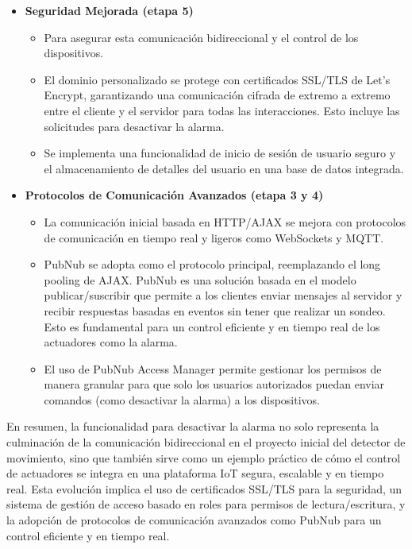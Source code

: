 \documentclass{report}
\begin{document}
\begin{itemize}
\begin{itemize}
        \item \textbf{Seguridad Mejorada (etapa 5)}
        \begin{itemize}
            \item Para asegurar esta comunicación bidireccional y el control de los dispositivos.
            \item El dominio personalizado se protege con certificados SSL/TLS de Let's Encrypt, garantizando una comunicación cifrada de extremo a extremo 
            entre el cliente y el servidor para todas las interacciones. Esto incluye las solicitudes para desactivar la alarma.
            \item Se implementa una funcionalidad de inicio de sesión de usuario seguro y el almacenamiento de detalles del usuario en una base de datos 
            integrada.
        \end{itemize}

        \item \textbf{Protocolos de Comunicación Avanzados (etapa 3 y 4)}
        \begin{itemize}
            \item La comunicación inicial basada en HTTP/AJAX se mejora con protocolos de comunicación en tiempo real y ligeros como WebSockets y MQTT.
            \item PubNub se adopta como el protocolo principal, reemplazando el long pooling de AJAX. PubNub es una solución basada en el modelo 
            publicar/suscribir que permite a los clientes enviar mensajes al servidor y recibir respuestas basadas en eventos sin tener que realizar 
            un sondeo. Esto es fundamental para un control eficiente y en tiempo real de los actuadores como la alarma.
            \item El uso de PubNub Access Manager permite gestionar los permisos de manera granular para que solo los usuarios autorizados puedan enviar 
            comandos (como desactivar la alarma) a los dispositivos.
        \end{itemize}
    \end{itemize}

\end{itemize}
En resumen, la funcionalidad para desactivar la alarma no solo representa la culminación de la comunicación bidireccional en el proyecto inicial del 
detector de movimiento, sino que también sirve como un ejemplo práctico de cómo el control de actuadores se integra en una plataforma IoT segura, escalable 
y en tiempo real. Esta evolución implica el uso de certificados SSL/TLS para la seguridad, un sistema de gestión de acceso basado en roles para permisos 
de lectura/escritura, y la adopción de protocolos de comunicación avanzados como PubNub para un control eficiente y en tiempo real.
\end{document}
